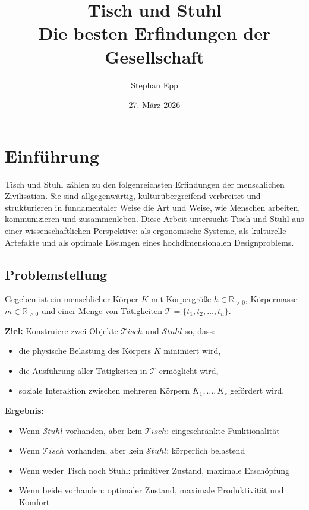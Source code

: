 \documentclass[a4paper,12pt]{article}
\title{\textbf{Tisch und Stuhl}\\Die besten Erfindungen der Gesellschaft}
\author{Stephan Epp}
\date{27. M\"{a}rz 2026}
\theoremstyle{definition}
\begin{document}
\maketitle

\tableofcontents
\newpage

\section{Einf\"{u}hrung}

Tisch und Stuhl z\"{a}hlen zu den folgenreichsten Erfindungen der menschlichen Zivilisation.
Sie sind allgegenw\"{a}rtig, kultur\"{u}bergreifend verbreitet und strukturieren in fundamentaler
Weise die Art und Weise, wie Menschen arbeiten, kommunizieren und zusammenleben.
Diese Arbeit untersucht Tisch und Stuhl aus einer wissenschaftlichen Perspektive: als
ergonomische Systeme, als kulturelle Artefakte und als optimale L\"{o}sungen eines
hochdimensionalen Designproblems.

\subsection{Problemstellung}

Gegeben ist ein menschlicher K\"{o}rper $K$ mit K\"{o}rpergr\"{o}\ss{}e $h \in \mathbb{R}_{>0}$,
K\"{o}rpermasse $m \in \mathbb{R}_{>0}$ und einer Menge von T\"{a}tigkeiten
$\mathcal{T} = \{t_1, t_2, \ldots, t_n\}$.

\textbf{Ziel:} Konstruiere zwei Objekte $\mathcal{T}\!isch$ und $\mathcal{S}tuhl$ so, dass:
\begin{itemize}
	\item die physische Belastung des K\"{o}rpers $K$ minimiert wird,
	\item die Ausf\"{u}hrung aller T\"{a}tigkeiten in $\mathcal{T}$ erm\"{o}glicht wird,
	\item soziale Interaktion zwischen mehreren K\"{o}rpern $K_1, \ldots, K_r$ gef\"{o}rdert wird.
\end{itemize}

\textbf{Ergebnis:}
\begin{itemize}
	\item Wenn $\mathcal{S}tuhl$ vorhanden, aber kein $\mathcal{T}\!isch$: eingeschr\"{a}nkte Funktionalit\"{a}t
	\item Wenn $\mathcal{T}\!isch$ vorhanden, aber kein $\mathcal{S}tuhl$: k\"{o}rperlich belastend
	\item Wenn weder Tisch noch Stuhl: primitiver Zustand, maximale Ersch\"{o}pfung
	\item Wenn beide vorhanden: optimaler Zustand, maximale Produktivit\"{a}t und Komfort
\end{itemize}
\end{document}
